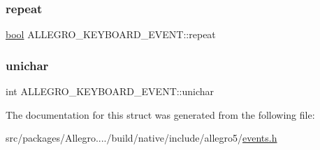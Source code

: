 \subsubsection{\texorpdfstring{repeat}{repeat}}
{\footnotesize\ttfamily \hyperlink{astdbool_8h_abb452686968e48b67397da5f97445f5b}{bool} A\+L\+L\+E\+G\+R\+O\+\_\+\+K\+E\+Y\+B\+O\+A\+R\+D\+\_\+\+E\+V\+E\+N\+T\+::repeat}

\mbox{\label{struct_a_l_l_e_g_r_o___k_e_y_b_o_a_r_d___e_v_e_n_t_a86c1c0df3a658ef138fbba95897ef380}} 
\subsubsection{\texorpdfstring{unichar}{unichar}}
{\footnotesize\ttfamily int A\+L\+L\+E\+G\+R\+O\+\_\+\+K\+E\+Y\+B\+O\+A\+R\+D\+\_\+\+E\+V\+E\+N\+T\+::unichar}



The documentation for this struct was generated from the following file\+:\begin{DoxyCompactItemize}
\item 
src/packages/\+Allegro..../build/native/include/allegro5/\hyperlink{events_8h}{events.\+h}\end{DoxyCompactItemize}
